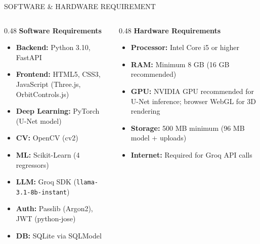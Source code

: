 \documentclass[aspectratio=169]{beamer}
\begin{document}
\begin{frame}{SOFTWARE \& HARDWARE REQUIREMENT}
\begin{columns}[T]
\begin{column}{0.48\textwidth}
\textbf{Software Requirements}
\begin{itemize}
  \item \textbf{Backend:} Python 3.10, FastAPI
  \item \textbf{Frontend:} HTML5, CSS3, JavaScript (Three.js, OrbitControls.js)
  \item \textbf{Deep Learning:} PyTorch (U-Net model)
  \item \textbf{CV:} OpenCV (cv2)
  \item \textbf{ML:} Scikit-Learn (4 regressors)
  \item \textbf{LLM:} Groq SDK (\texttt{llama-3.1-8b-instant})
  \item \textbf{Auth:} Passlib (Argon2), JWT (python-jose)
  \item \textbf{DB:} SQLite via SQLModel
\end{itemize}
\end{column}
\begin{column}{0.48\textwidth}
\textbf{Hardware Requirements}
\begin{itemize}
  \item \textbf{Processor:} Intel Core i5 or higher
  \item \textbf{RAM:} Minimum 8 GB (16 GB recommended)
  \item \textbf{GPU:} NVIDIA GPU recommended for U-Net inference; browser WebGL for 3D rendering
  \item \textbf{Storage:} 500 MB minimum (96 MB model + uploads)
  \item \textbf{Internet:} Required for Groq API calls
\end{itemize}
\end{column}
\end{columns}
\end{frame}
\end{document}
